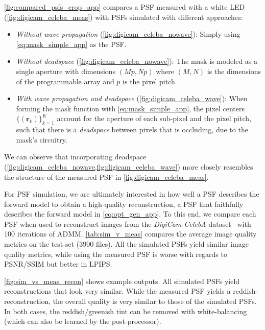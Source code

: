 \noindent \cref{fig:compared_psfs_crop_app} compares a PSF measured with a white LED (\cref{fig:digicam_celeba_meas}) with PSFs simulated with different approaches:
\begin{itemize}
    \item \textit{Without wave propagation} (\cref{fig:digicam_celeba_nowave}): Simply using \cref{eq:mask_simple_app} as the PSF.
    \item \textit{Without deadspace} (\cref{fig:digicam_celeba_nowave}): 
    The mask is modeled as a single aperture with dimensions $(Mp, Np)$ where $(M,N)$ is the dimensions of the programmable array and $p$ is the pixel pitch.
    \item \textit{With wave propagation and deadspace} (\cref{fig:digicam_celeba_wave}): When forming the mask function with \cref{eq:mask_simple_app}, the pixel centers $ \{(\bm{r}_k)\}_{k=1}^{K} $ account for the aperture of each sub-pixel and the pixel pitch, such that there is a \textit{deadspace} between pixels that is occluding, \ie due to the mask's circuitry.
\end{itemize}
We can observe that incorporating deadspace (\ie \cref{fig:digicam_celeba_nowave,fig:digicam_celeba_wave}) more closely resembles the structure of the measured PSF in \cref{fig:digicam_celeba_meas}.

For PSF simulation, we are ultimately interested in how well a PSF describes the forward model to obtain a high-quality reconstruction, 
\ie a PSF that faithfully describes the forward model in \cref{eq:opt_gen_app}.
To this end, we compare each PSF when used to reconstruct images from the \textit{DigiCam-CelebA} dataset~\cite{digicam_celeba} with 100 iterations of ADMM.
\cref{tab:sim_v_meas} compares the average image quality metrics on the test set (3900 files).
All the simulated PSFs yield similar image quality metrics,
while using the measured PSF is worse with regards to PSNR/SSIM but better in LPIPS.

\cref{fig:sim_vs_meas_recon} shows example outputs. All simulated PSFs yield reconstructions that look very similar.
While the measured PSF yields a reddish-reconstruction,
the overall quality is very similar to those of the simulated PSFs.
In both cases, the reddish/greenish tint can be removed with white-balancing (which can also be learned by the post-processor). 

